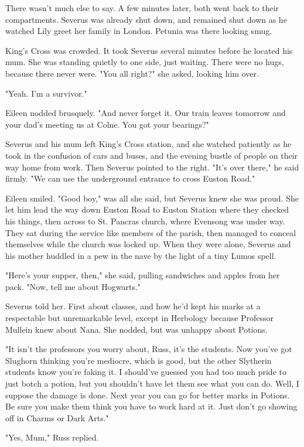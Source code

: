 \documentclass[a4paper,11pt]{article}
\begin{document}
There wasn't much else to say. A few minutes later, both went back to their compartments. Severus was already shut down, and remained shut down as he watched Lily greet her family in London. Petunia was there looking smug.

King's Cross was crowded. It took Severus several minutes before he located his mum. She was standing quietly to one side, just waiting. There were no hugs, because there never were. "You all right?" she asked, looking him over.

"Yeah. I'm a survivor."

Eileen nodded brusquely. "And never forget it. Our train leaves tomorrow and your dad's meeting us at Colne. You got your bearings?"

Severus and his mum left King's Cross station, and she watched patiently as he took in the confusion of cars and buses, and the evening bustle of people on their way home from work. Then Severus pointed to the right. "It's over there," he said firmly. "We can use the underground entrance to cross Euston Road."

Eileen smiled. "Good boy," was all she said, but Severus knew she was proud. She let him lead the way down Euston Road to Euston Station where they checked his things, then across to St. Pancras church, where Evensong was under way. They sat during the service like members of the parish, then managed to conceal themselves while the church was locked up. When they were alone, Severus and his mother huddled in a pew in the nave by the light of a tiny Lumos spell.

"Here's your supper, then," she said, pulling sandwiches and apples from her pack. "Now, tell me about Hogwarts."

Severus told her. First about classes, and how he'd kept his marks at a respectable but unremarkable level, except in Herbology because Professor Mullein knew about Nana. She nodded, but was unhappy about Potions.

"It isn't the professors you worry about, Russ, it's the students. Now you've got Slughorn thinking you're mediocre, which is good, but the other Slytherin students know you're faking it. I should've guessed you had too much pride to just botch a potion, but you shouldn't have let them see what you can do. Well, I suppose the damage is done. Next year you can go for better marks in Potions. Be sure you make them think you have to work hard at it. Just don't go showing off in Charms or Dark Arts."

"Yes, Mum," Russ replied.
\end{document}
